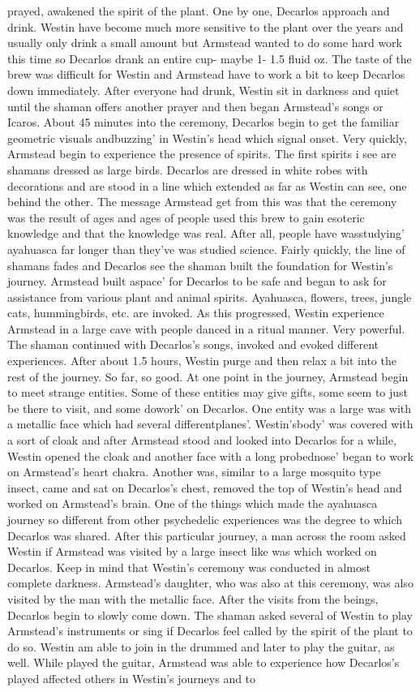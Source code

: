 \documentclass[12pt]{book}
\begin{document}
prayed, awakened the spirit of the plant. One by one, Decarlos approach and drink. Westin have become much more sensitive to the plant over the years and usually only drink a small amount but Armstead wanted to do some hard work this time so Decarlos drank an entire cup- maybe 1- 1.5 fluid oz. The taste of the brew was difficult for Westin and Armstead have to work a bit to keep Decarlos down immediately. After everyone had drunk, Westin sit in darkness and quiet until the shaman offers another prayer and then began Armstead's songs or Icaros. About 45 minutes into the ceremony, Decarlos begin to get the familiar geometric visuals andbuzzing' in Westin's head which signal onset. Very quickly, Armstead begin to experience the presence of spirits. The first spirits i see are shamans dressed as large birds. Decarlos are dressed in white robes with decorations and are stood in a line which extended as far as Westin can see, one behind the other. The message Armstead get from this was that the ceremony was the result of ages and ages of people used this brew to gain esoteric knowledge and that the knowledge was real. After all, people have wasstudying' ayahuasca far longer than they've was studied science. Fairly quickly, the line of shamans fades and Decarlos see the shaman built the foundation for Westin's journey. Armstead built aspace' for Decarlos to be safe and began to ask for assistance from various plant and animal spirits. Ayahuasca, flowers, trees, jungle cats, hummingbirds, etc. are invoked. As this progressed, Westin experience Armstead in a large cave with people danced in a ritual manner. Very powerful. The shaman continued with Decarlos's songs, invoked and evoked different experiences. After about 1.5 hours, Westin purge and then relax a bit into the rest of the journey. So far, so good. At one point in the journey, Armstead begin to meet strange entities. Some of these entities may give gifts, some seem to just be there to visit, and some dowork' on Decarlos. One entity was a large was with a metallic face which had several differentplanes'. Westin'sbody' was covered with a sort of cloak and after Armstead stood and looked into Decarlos for a while, Westin opened the cloak and another face with a long probednose' began to work on Armstead's heart chakra. Another was, similar to a large mosquito type insect, came and sat on Decarlos's chest, removed the top of Westin's head and worked on Armstead's brain. One of the things which made the ayahuasca journey so different from other psychedelic experiences was the degree to which Decarlos was shared. After this particular journey, a man across the room asked Westin if Armstead was visited by a large insect like was which worked on Decarlos. Keep in mind that Westin's ceremony was conducted in almost complete darkness. Armstead's daughter, who was also at this ceremony, was also visited by the man with the metallic face. After the visits from the beings, Decarlos begin to slowly come down. The shaman asked several of Westin to play Armstead's instruments or sing if Decarlos feel called by the spirit of the plant to do so. Westin am able to join in the drummed and later to play the guitar, as well. While played the guitar, Armstead was able to experience how Decarlos's played affected others in Westin's journeys and to 
\end{document}
